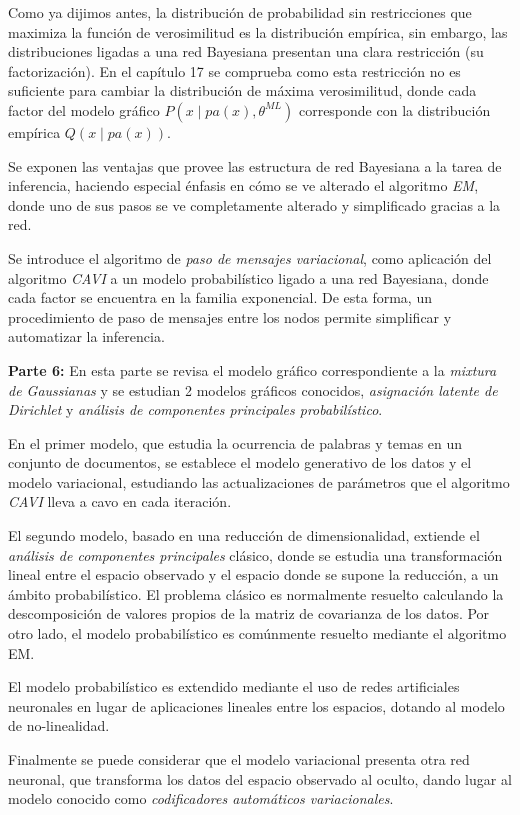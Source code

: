 Como ya dijimos antes, la distribución de probabilidad sin restricciones que maximiza la función de verosimilitud es la distribución empírica, sin embargo, las distribuciones ligadas a una red Bayesiana presentan una clara restricción (su factorización). En el capítulo 17 se comprueba como esta restricción no es suficiente para cambiar la distribución de máxima verosimilitud, donde cada factor del modelo gráfico \(P(x \mid pa(x), \theta^{ML})\)  corresponde con la distribución empírica \(Q(x \mid pa(x))\).

Se exponen las ventajas que provee las estructura de red Bayesiana a la tarea de inferencia, haciendo especial énfasis en cómo se ve alterado el algoritmo \emph{EM}, donde uno de sus pasos se ve completamente alterado y simplificado gracias a la red.

Se introduce el algoritmo de \emph{paso de mensajes variacional}, como aplicación del algoritmo \emph{CAVI} a un modelo probabilístico ligado a una red Bayesiana, donde cada factor se encuentra en la familia exponencial. De esta forma, un procedimiento de paso de mensajes entre los nodos permite simplificar y automatizar la  inferencia.

\textbf{Parte 6:} En esta parte se revisa el modelo gráfico correspondiente a la \emph{mixtura de Gaussianas} y se estudian 2 modelos gráficos conocidos, \emph{asignación latente de Dirichlet} y \emph{análisis de componentes principales probabilístico}.

En el primer modelo, que estudia la ocurrencia de palabras y temas en un conjunto de documentos, se establece el modelo generativo de los datos y el modelo variacional, estudiando las actualizaciones de parámetros que el algoritmo \emph{CAVI} lleva a cavo en cada iteración.

El segundo modelo, basado en una reducción de dimensionalidad, extiende el \emph{análisis de componentes principales} clásico, donde se estudia una transformación lineal entre el espacio observado y el espacio donde se supone la reducción, a un ámbito probabilístico. El problema clásico es normalmente resuelto calculando la descomposición de valores propios de la matriz de covarianza de los datos. Por otro lado, el modelo probabilístico es comúnmente resuelto mediante el algoritmo EM.

El modelo probabilístico es extendido mediante el uso de redes artificiales neuronales en lugar de aplicaciones lineales entre los espacios, dotando al modelo de no-linealidad.

Finalmente se puede considerar que el modelo variacional presenta otra red neuronal, que transforma los datos del espacio observado al oculto, dando lugar al modelo conocido como \emph{codificadores automáticos variacionales}.

